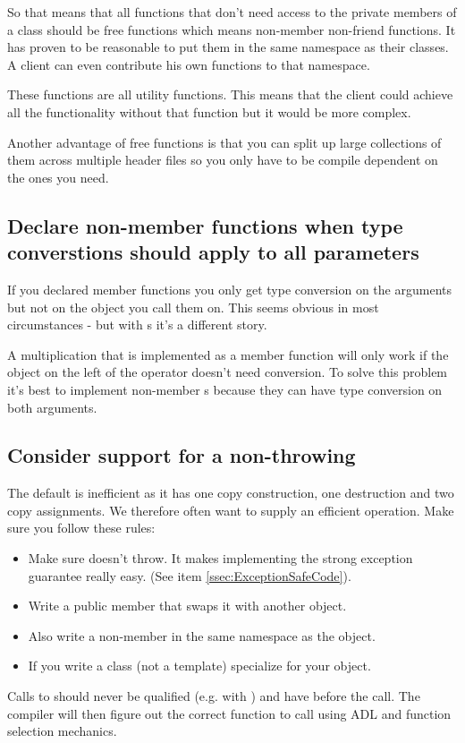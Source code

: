 \documentclass[a4paper, twocolumn]{article}
\let\oldsubsection\subsection
\newcounter{mysubsection}
\renewcommand{\subsection}{
    \stepcounter{mysubsection}
    \oldsubsection
}
\newcommand{\code}[1]{\texttt{\color{black}{#1}}}
\begin{document}
So that means that all functions that don't need access to the private members of a class should be free functions which means non-member non-friend functions. It has proven to be reasonable to put them in the same namespace as their classes. A client can even contribute his own functions to that namespace.

These functions are all utility functions. This means that the client could achieve all the functionality without that function but it would be more complex.

Another advantage of free functions is that you can split up large collections of them across multiple header files so you only have to be compile dependent on the ones you need.

\subsection{Declare non-member functions when type converstions should apply to all parameters} \label{ssec:freeFunctions2}
If you declared member functions you only get type conversion on the arguments but not on the object you call them on. This seems obvious in most circumstances - but with \code{operator}s it's a different story.

A multiplication that is implemented as a member function will only work if the object on the left of the operator doesn't need conversion. To solve this problem it's best to implement non-member \code{operator}s because they can have type conversion on both arguments.

\subsection{Consider support for a non-throwing \code{swap}}
The default \code{std::swap} is inefficient as it has one copy construction,  one destruction and two copy assignments. We therefore often want to supply an efficient \code{swap} operation. Make sure you follow these rules:
\begin{itemize}
	\item Make sure \code{swap} doesn't throw. It makes implementing the strong exception guarantee really easy. (See item \ref{ssec:ExceptionSafeCode}).
	\item Write a public member \code{swap} that swaps it with another object.
	\item Also write a non-member \code{swap} in the same namespace as the object.
	\item If you write a class (not a template) specialize \code{std::swap} for your object.
\end{itemize}
Calls to \code{swap} should never be qualified (e.g. with \code{std::}) and have \code{using std::swap;} before the call. The compiler will then figure out the correct \code{swap} function to call using ADL and function selection mechanics.
\newpage
\end{document}
